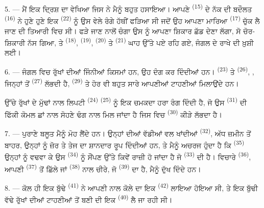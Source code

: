 5. --- ਮੈਂ ਇਕ ਦ੍ਰਿਸ਼ ਦਾ  ਵੇਖਿਆ ਜਿਸ ਨੇ ਮੈਨੂੰ ਬਹੁਤ ਹਸਾਇਆ। ਆਪਣੇ
 \textsuperscript{(15)} ਦੇ ਨੱਕ ਦੀ ਬਦੌਲਤ 
\textsuperscript{(16)} ਨੇ ਹੁਣੇ ਹੁਣੇ ਇਕ  \textsuperscript{(22)}
ਨੂੰ ਉਸ ਵੇਲੇ ਰੰਗੇ ਹੱਥੀਂ ਫੜਿਆ ਸੀ ਜਦੋਂ ਉਹ ਆਪਣਾ ਮਾਰਿਆ 
\textsuperscript{(17)} ਚੁੱਕ ਲੈ ਜਾਣ ਦੀ ਤਿਆਰੀ ਵਿਚ ਸੀ। ਫੜੇ ਜਾਣ ਨਾਲੋਂ ਚੰਗਾ ਉਸ ਨੂੰ ਆਪਣਾ
ਸ਼ਿਕਾਰ ਛੱਡ ਦੇਣਾ ਲੱਗਾ, ਸੋ ਚੋਰ-ਸ਼ਿਕਾਰੀ ਨੱਸ ਗਿਆ, ਤੇ 
\textsuperscript{(18)},  \textsuperscript{(19)},
 \textsuperscript{(20)} ਤੇ 
\textsuperscript{(21)} ਘਾਹ ਉੱਤੇ ਪਏ ਰਹਿ ਗਏ, ਜੰਗਲ ਦੇ ਰਾਖੇ ਦੀ ਖ਼ੁਸ਼ੀ ਲਈ।

6. --- ਜੰਗਲ ਵਿਚ ਰੁੱਖਾਂ ਦੀਆਂ ਜਿੰਨੀਆਂ ਕਿਸਮਾਂ ਹਨ, ਉਹ ਦੰਗ ਕਰ ਦਿੰਦੀਆਂ ਹਨ।
 \textsuperscript{(23)} ਤੇ  \textsuperscript{(26)},
, ਜਿਨ੍ਹਾਂ ਤੋਂ  \textsuperscript{(27)} ਲੱਭਦੀ ਹੈ,
 \textsuperscript{(29)} ਤੇ ਹੋਰ ਵੀ ਬਹੁਤ ਸਾਰੇ ਆਪਣੀਆਂ ਟਾਹਣੀਆਂ ਮਿਲਾਉਂਦੇ
ਹਨ।

ਉੱਚੇ ਰੁੱਖਾਂ ਦੇ ਮੁੱਢਾਂ ਨਾਲ ਲਿਪਟੀ  \textsuperscript{(24)}
 \textsuperscript{(25)} ਨੂੰ ਇਕ ਚਮਕਦਾ ਹਰਾ ਰੰਗ ਦਿੰਦੀ ਹੈ, ਜੋ ਉਸ
 \textsuperscript{(31)} ਦੀ ਫਿੱਕੀ ਕੋਮਲ ਛਾਂ ਨਾਲ ਸੋਹਣੇ ਢੰਗ ਨਾਲ ਮਿਲ ਜਾਂਦਾ
ਹੈ ਜਿਸ ਵਿਚ  \textsuperscript{(30)} ਕੀੜੇ ਲੱਭਦਾ ਹੈ।

\VUsaut{3.0mm}
\VUsaut{3.0mm}

7. --- ਪੁਰਾਣੇ ਬਲੂਤ ਮੈਨੂੰ ਮੋਹ ਲੈਂਦੇ ਹਨ। ਉਨ੍ਹਾਂ ਦੀਆਂ ਵੱਡੀਆਂ ਵਲ ਖਾਂਦੀਆਂ
 \textsuperscript{(32)}, ਅੱਧ ਜ਼ਮੀਨ ਤੋਂ ਬਾਹਰ, ਉਨ੍ਹਾਂ ਨੂੰ ਜ਼ੋਰ ਤੇ ਤੇਜ
ਦਾ ਸ਼ਾਨਦਾਰ ਰੂਪ ਦਿੰਦੀਆਂ ਹਨ, ਤੇ ਮੈਨੂੰ ਅਚਰਜ ਹੁੰਦਾ ਹੈ ਕਿ 
\textsuperscript{(35)} ਉਨ੍ਹਾਂ ਨੂੰ ਵਢਵਾ ਕੇ ਉਸ  \textsuperscript{(34)} ਨੂੰ
ਸੌਂਪਣ ਉੱਤੇ ਕਿਵੇਂ ਰਾਜ਼ੀ ਹੋ ਜਾਂਦਾ ਹੈ ਜੋ  \textsuperscript{(33)} ਦੀ
ਹੈ। ਵਿਚਾਰੇ  \textsuperscript{(36)}, ਆਪਣੀ 
\textsuperscript{(37)} ਤੋਂ ਛਿੱਲੇ ਜਾਂ  \textsuperscript{(38)} ਨਾਲ ਚੀਰੇ,
ਜੋ  \textsuperscript{(39)} ਦਾ ਹੈ, ਮੈਨੂੰ ਦੁੱਖ ਦਿੰਦੇ ਹਨ।

8. --- ਕੋਲ ਹੀ ਇਕ ਬੁੱਢੇ  \textsuperscript{(41)} ਨੇ ਆਪਣੀ
 ਨਾਲ ਕੋਲੇ ਦਾ ਇਕ  \textsuperscript{(42)} ਲਾਇਆ ਹੋਇਆ ਸੀ, ਤੇ ਇਕ
ਬੁੱਢੀ ਵੱਢੇ ਰੁੱਖਾਂ ਦੀਆਂ ਟਾਹਣੀਆਂ ਤੋਂ ਬਣੀ  ਦੀ ਇਕ
 \textsuperscript{(40)} ਲੈ ਜਾ ਰਹੀ ਸੀ।

\VUsaut{3.0mm}
\VUsaut{3.0mm}

